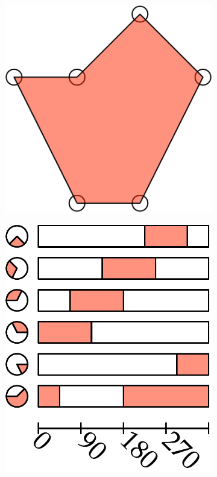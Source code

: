 \begin{figure}
\centering
\begin{subfigure}[b]{0.5\linewidth}
\includegraphics[width=\linewidth]{figs/nef-1}
\caption{}%
\end{subfigure}
\begin{subfigure}[b]{0.35\linewidth}
\includegraphics[width=\linewidth]{figs/nef-2}

\end{subfigure}
\end{figure}

